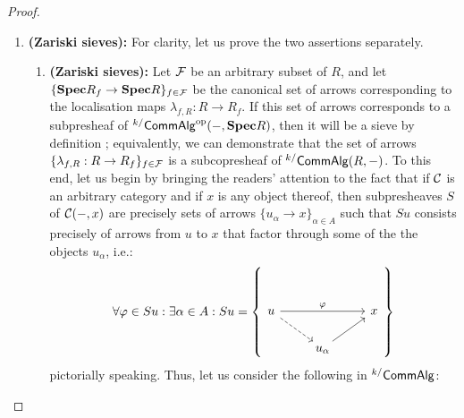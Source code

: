                         \begin{proof}
                            \noindent
                            \begin{enumerate}
                                \item \textbf{(Zariski sieves):} For clarity, let us prove the two assertions separately.
                                    \begin{enumerate}
                                        \item \textbf{(Zariski sieves):} Let $\mathcal{F}$ be an arbitrary subset of $R$, and let $\{\mathbf{Spec} R_f \to \mathbf{Spec} R\}_{f \in \mathcal{F}}$ be the canonical set of arrows corresponding to the localisation maps $\lambda_{f, R}: R \to R_f$. If this set of arrows corresponds to a subpresheaf of ${}^{k/}\mathsf{Comm}\mathsf{Alg}^{\mathrm{op}}(-, \mathbf{Spec} R)$, then it will be a sieve by definition \cite[Definition 2.38]{vistoli_descent}; equivalently, we can demonstrate that the set of arrows $\{\lambda_{f, R}: R \to R_f\}_{f \in \mathcal{F}}$ is a subcopresheaf of ${}^{k/}\mathsf{Comm}\mathsf{Alg}(R, -)$. To this end, let us begin by bringing the readers' attention to the fact that if $\mathcal{C}$ is an arbitrary category and if $x$ is any object thereof, then subpresheaves $S$ of $\mathcal{C}(-, x)$ are precisely sets of arrows $\{u_{\alpha} \to x\}_{\alpha \in A}$ such that $Su$ consists precisely of arrows from $u$ to $x$ that factor through some of the the objects $u_{\alpha}$, i.e.:
                                            $$
                                                \forall \varphi \in Su: \exists \alpha \in A: Su =
                                                \left\{
                                                    \begin{tikzcd}
                                                    	{} \\
                                                    	u && x \\
                                                    	& {u_{\alpha}}
                                                    	\arrow[dashed, from=2-1, to=3-2]
                                                    	\arrow[from=3-2, to=2-3]
                                                    	\arrow["\varphi", from=2-1, to=2-3]
                                                    \end{tikzcd}
                                                \right\}
                                            $$
                                        pictorially speaking. Thus, let us consider the following in ${}^{k/}\mathsf{Comm}\mathsf{Alg}$:

\end{enumerate}
\end{enumerate}
\end{proof}
